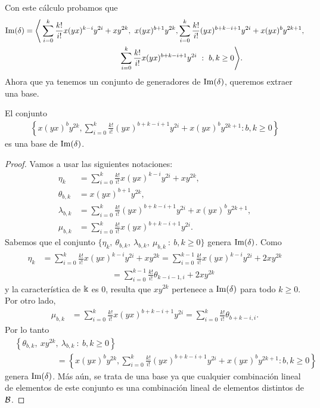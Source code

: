 \documentclass[fleqn,../tesis.tex]{subfiles}
\begin{document}
Con este cálculo probamos que
\begin{align*}
	\Ima(\delta) = \Bigg\langle &\sum_{i = 0}^k\frac{k!}{i!}x(yx)^{k - i}y^{2i} + xy^{2k},\ x(yx)^{b + 1}y^{2k},
		 \sum_{i = 0}^k\frac{k!}{i!}(yx)^{b + k - i + 1}y^{2i} + x(yx)^by^{2k + 1}, \\
		&\hspace{100pt}\sum_{i = 0}^k\frac{k!}{i!}x(yx)^{b + k - i + 1}y^{2i}\ :\ b,k \geq 0	\Bigg\rangle.
\end{align*}
Ahora que ya tenemos un conjunto de generadores de $\operatorname{Im}(\delta)$, queremos extraer una base.
\begin{prop}
\label{imdelta}
El conjunto
\begin{align*}
		\left\{ x(yx)^by^{2k},
			\sum_{i = 0}^k\frac{k!}{i!}(yx)^{b + k - i + 1}y^{2i} + x(yx)^by^{2k + 1} :b, k \geq 0 \right\}
\end{align*}
es una base de $\operatorname{Im}(\delta)$.
\end{prop}
\begin{proof}
Vamos a usar las siguientes notaciones:
\begin{align*}
	\eta_k &=  \sum_{i = 0}^k\frac{k!}{i!}x(yx)^{k - i}y^{2i} + xy^{2k}, \\
	\theta_{b,k} &= x(yx)^{b + 1}y^{2k},\\
	\lambda_{b,k} &= \sum_{i = 0}^k\frac{k!}{i!}(yx)^{b + k - i + 1}y^{2i} + x(yx)^by^{2k + 1}, \\
	\mu_{b,k} &= \sum_{i = 0}^k\frac{k!}{i!}x(yx)^{b + k - i + 1}y^{2i}.
\end{align*}
Sabemos que el conjunto $\{\eta_k,\ \theta_{b,k},\ \lambda_{b,k},\ \mu_{b,k}\ :\ b,k \geq 0\}$ genera $\operatorname{Im}(\delta)$.
Como
\begin{align*}
	\eta_k &= \sum_{i = 0}^{k}\frac{k!}{i!}x(yx)^{k - i}y^{2i} + xy^{2k}
		= \sum_{i = 0}^{k-1}\frac{k!}{i!}x(yx)^{k - i}y^{2i} + 2xy^{2k} \\
	&\hspace{100pt}= \sum_{i = 0}^{k -1}\frac{k!}{i!}\theta_{k - i - 1, i} + 2xy^{2k}
\end{align*}
y la característica de $\Bbbk$ es 0, resulta que $xy^{2k}$ pertenece a $\operatorname{Im}(\delta)$ para todo $k \geq 0$. Por otro lado,
\begin{align*}
	\mu_{b,k} &= \sum_{i = 0}^k\frac{k!}{i!}x(yx)^{b + k - i + 1}y^{2i}
		= \sum_{i = 0}^k\frac{k!}{i!}\theta_{b + k - i, i}.
\end{align*}
Por lo tanto
\begin{align*}
	&\left\{\theta_{b,k},\ xy^{2k},\ \lambda_{b,k}\ :\ b,k \geq 0 \right\} \\
	&\hspace{60pt}= \left\{ x(yx)^by^{2k},
			\sum_{i = 0}^k\frac{k!}{i!}(yx)^{b + k - i + 1}y^{2i} + x(yx)^by^{2k + 1} :b, k \geq 0 \right\}
\end{align*}
genera $\operatorname{Im}(\delta)$. Más aún, se trata de una base ya que cualquier combinación lineal de elementos de este conjunto es una
combinación lineal de elementos distintos de $\mathcal{B}$.
\end{proof}
\end{document}
